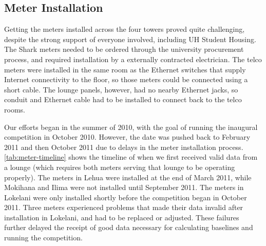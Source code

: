 \subsection{Meter Installation}
\label{sec:meter-installation}

Getting the meters installed across the four towers proved quite challenging, despite the strong support of everyone involved, including UH \Manoa Student Housing. The Shark meters needed to be ordered through the university procurement process, and required installation by a externally contracted electrician. The telco meters were installed in the same room as the Ethernet switches that supply Internet connectivity to the floor, so those meters could be connected using a short cable. The lounge panels, however, had no nearby Ethernet jacks, so conduit and Ethernet cable had to be installed to connect back to the telco rooms.

Our efforts began in the summer of 2010, with the goal of running the inaugural competition in October 2010. However, the date was pushed back to February 2011 and then October 2011 due to delays in the meter installation process. \autoref{tab:meter-timeline} shows the timeline of when we first received valid data from a lounge (which requires both meters serving that lounge to be operating properly). The meters in Lehua were installed at the end of March 2011, while Mokihana and Ilima were not installed until September 2011. The meters in Lokelani were only installed shortly before the competition began in October 2011. Three meters experienced problems that made their data invalid after installation in Lokelani, and had to be replaced or adjusted. These failures further delayed the receipt of good data necessary for calculating baselines and running the competition.

